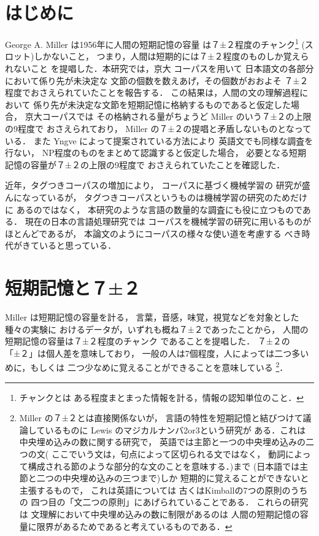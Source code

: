 

\maketitle


\section{はじめに}
George A. Miller は1956年に人間の短期記憶の容量
は７±２程度のチャンク\footnote{
チャンクとは
ある程度まとまった情報を計る，情報の認知単位のこと．}
(スロット)しかないこと，
つまり，人間は短期的には７±２程度のものしか覚えられないこと
を提唱した\cite{miller56}．本研究では，京大
コーパス\cite{kurohashi_nlp97}を用いて
日本語文の各部分において係り先が未決定な
文節の個数を数えあげ，その個数がおおよそ
７±２程度でおさえられていたことを報告する．
この結果は，人間の文の理解過程において
係り先が未決定な文節を短期記憶に格納するものであると仮定した場合，
京大コーパスでは
その格納される量がちょうど Miller のいう７±２の上限の9程度で
おさえられており，
Miller の７±２の提唱と矛盾しないものとなっている．
また Yngve によって提案されている方法\cite{yngve60}により
英語文でも同様な調査を行ない，
NP程度のものをまとめて認識すると仮定した場合，
必要となる短期記憶の容量が７±２の上限の9程度で
おさえられていたことを確認した．

近年，タグつきコーパスの増加により，
コーパスに基づく機械学習の
研究が盛んになっているが\cite{murata:nlken98}，
タグつきコーパスというものは機械学習の研究のためだけに
あるのではなく，
本研究のような言語の数量的な調査にも役に立つものである．
現在の日本の言語処理研究では
コーパスを機械学習の研究に用いるものがほとんどであるが，
本論文のようにコーパスの様々な使い道を考慮する
べき時代がきていると思っている．

\section{短期記憶と７±２}

 Miller は短期記憶の容量を計る，
言葉，音感，味覚，視覚などを対象とした種々の実験に
おけるデータが，いずれも概ね７±２であったことから，
人間の短期記憶の容量は７±２程度のチャンク
であることを提唱した．
７±２の「±２」は個人差を意味しており，
一般の人は7個程度，人によっては二つ多いめに，もしくは
二つ少なめに覚えることができることを意味している
\footnote{
\baselineskip
Miller の７±２とは直接関係ないが，
言語の特性を短期記憶と結びつけて議論しているものに
Lewis のマジカルナンバ2or3\cite{Lewis96}という研究が
ある．これは中央埋め込みの数に関する研究で，
英語では主節と一つの中央埋め込みの二つの文(
ここでいう文は，句点によって区切られる文ではなく，
動詞によって構成される節のような部分的な文のことを意味する．)まで
(日本語では主節と二つの中央埋め込みの三つまで)しか
短期的に覚えることができないと主張するもので，
これは英語については
古くはKimballの7つの原則\cite{Kimball73}のうちの
四つ目の「文二つの原則」にあげられていることである．
これらの研究は
文理解において中央埋め込みの数に制限があるのは
人間の短期記憶の容量に限界があるためであると考えているものである．}．

